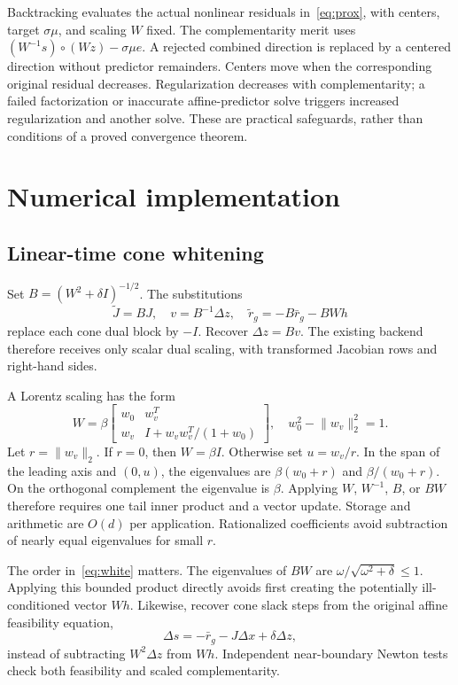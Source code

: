 \documentclass[conference]{IEEEtran}
\newcommand{\norm}[1]{\lVert#1\rVert}
\begin{document}
Backtracking evaluates the actual nonlinear residuals in~\eqref{eq:prox}, with centers, target $\sigma\mu$, and scaling $W$ fixed. The complementarity merit uses $(W^{-1}s)\circ(Wz)-\sigma\mu e$. A rejected combined direction is replaced by a centered direction without predictor remainders. Centers move when the corresponding original residual decreases. Regularization decreases with complementarity; a failed factorization or inaccurate affine-predictor solve triggers increased regularization and another solve. These are practical safeguards, rather than conditions of a proved convergence theorem.

\section{Numerical implementation}
\subsection{Linear-time cone whitening}
Set $B=(W^2+\delta I)^{-1/2}$. The substitutions
\begin{equation}\label{eq:white}
 \widetilde J=BJ,\quad v=B^{-1}\Delta z,\quad
 \widetilde r_g=-B\bar r_g-BWh
\end{equation}
replace each cone dual block by $-I$. Recover $\Delta z=Bv$. The existing backend therefore receives only scalar dual scaling, with transformed Jacobian rows and right-hand sides.

A Lorentz scaling has the form
\begin{equation}
 W=\beta\begin{bmatrix}w_0&w_v^T\\w_v&I+w_vw_v^T/(1+w_0)\end{bmatrix},
 \quad w_0^2-\norm{w_v}_2^2=1.
\end{equation}
Let $r=\norm{w_v}_2$. If $r=0$, then $W=\beta I$. Otherwise set $u=w_v/r$. In the span of the leading axis and $(0,u)$, the eigenvalues are $\beta(w_0+r)$ and $\beta/(w_0+r)$. On the orthogonal complement the eigenvalue is $\beta$. Applying $W$, $W^{-1}$, $B$, or $BW$ therefore requires one tail inner product and a vector update. Storage and arithmetic are $O(d)$ per application. Rationalized coefficients avoid subtraction of nearly equal eigenvalues for small $r$.

The order in~\eqref{eq:white} matters. The eigenvalues of $BW$ are $\omega/\sqrt{\omega^2+\delta}\leq1$. Applying this bounded product directly avoids first creating the potentially ill-conditioned vector $Wh$. Likewise, recover cone slack steps from the original affine feasibility equation,
\begin{equation}\label{eq:recovery}
 \Delta s=-\bar r_g-J\Delta x+\delta\Delta z,
\end{equation}
instead of subtracting $W^2\Delta z$ from $Wh$. Independent near-boundary Newton tests check both feasibility and scaled complementarity.
\end{document}

